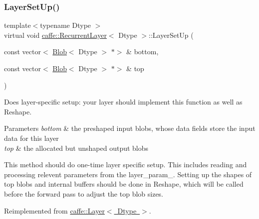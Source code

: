 \mbox{\label{classcaffe_1_1_recurrent_layer_a8e4537f7dd87a9cce60096e8ab04e843}} 
\subsubsection{\texorpdfstring{Layer\+Set\+Up()}{LayerSetUp()}\hspace{0.1cm}{\footnotesize\ttfamily [2/2]}}
{\footnotesize\ttfamily template$<$typename Dtype $>$ \\
virtual void \mbox{\hyperlink{classcaffe_1_1_recurrent_layer}{caffe\+::\+Recurrent\+Layer}}$<$ Dtype $>$\+::Layer\+Set\+Up (\begin{DoxyParamCaption}\item[{const vector$<$ \mbox{\hyperlink{classcaffe_1_1_blob}{Blob}}$<$ Dtype $>$ $\ast$$>$ \&}]{bottom,  }\item[{const vector$<$ \mbox{\hyperlink{classcaffe_1_1_blob}{Blob}}$<$ Dtype $>$ $\ast$$>$ \&}]{top }\end{DoxyParamCaption})\hspace{0.3cm}{\ttfamily [virtual]}}



Does layer-\/specific setup\+: your layer should implement this function as well as Reshape. 


\begin{DoxyParams}{Parameters}
{\em bottom} & the preshaped input blobs, whose data fields store the input data for this layer \\
\hline
{\em top} & the allocated but unshaped output blobs\\
\hline
\end{DoxyParams}
This method should do one-\/time layer specific setup. This includes reading and processing relevent parameters from the {\ttfamily layer\+\_\+param\+\_\+}. Setting up the shapes of top blobs and internal buffers should be done in {\ttfamily Reshape}, which will be called before the forward pass to adjust the top blob sizes. 

Reimplemented from \mbox{\hyperlink{classcaffe_1_1_layer_a481323a3e0972c682787f2137468c29f}{caffe\+::\+Layer$<$ Dtype $>$}}.

\mbox{\label{classcaffe_1_1_recurrent_layer_a983e1ead91884f9d2049a3000254961c}} 
